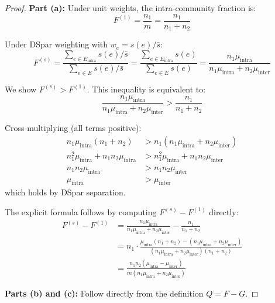 \documentclass[10pt,journal,compsoc]{IEEEtran}
\begin{document}
\begin{proof}
\textbf{Part (a):} Under unit weights, the intra-community fraction is:
\begin{equation}
F^{(1)} = \frac{n_1}{m} = \frac{n_1}{n_1 + n_2}
\end{equation}

Under DSpar weighting with $w_e = s(e)/\bar{s}$:
\begin{equation}
F^{(s)} = \frac{\sum_{e \in E_{\text{intra}}} s(e)/\bar{s}}{\sum_{e \in E} s(e)/\bar{s}} = \frac{\sum_{e \in E_{\text{intra}}} s(e)}{\sum_{e \in E} s(e)} = \frac{n_1 \mu_{\text{intra}}}{n_1 \mu_{\text{intra}} + n_2 \mu_{\text{inter}}}
\end{equation}

We show $F^{(s)} > F^{(1)}$. This inequality is equivalent to:
\begin{equation}
\frac{n_1 \mu_{\text{intra}}}{n_1 \mu_{\text{intra}} + n_2 \mu_{\text{inter}}} > \frac{n_1}{n_1 + n_2}
\end{equation}

Cross-multiplying (all terms positive):
\begin{align}
n_1 \mu_{\text{intra}} (n_1 + n_2) &> n_1 (n_1 \mu_{\text{intra}} + n_2 \mu_{\text{inter}}) \\
n_1^2 \mu_{\text{intra}} + n_1 n_2 \mu_{\text{intra}} &> n_1^2 \mu_{\text{intra}} + n_1 n_2 \mu_{\text{inter}} \\
n_1 n_2 \mu_{\text{intra}} &> n_1 n_2 \mu_{\text{inter}} \\
\mu_{\text{intra}} &> \mu_{\text{inter}}
\end{align}
which holds by DSpar separation.

The explicit formula follows by computing $F^{(s)} - F^{(1)}$ directly:
\begin{align}
F^{(s)} - F^{(1)} &= \frac{n_1 \mu_{\text{intra}}}{n_1 \mu_{\text{intra}} + n_2 \mu_{\text{inter}}} - \frac{n_1}{n_1 + n_2} \\
&= n_1 \cdot \frac{\mu_{\text{intra}}(n_1 + n_2) - (n_1 \mu_{\text{intra}} + n_2 \mu_{\text{inter}})}{(n_1 \mu_{\text{intra}} + n_2 \mu_{\text{inter}})(n_1 + n_2)} \\
&= \frac{n_1 n_2 (\mu_{\text{intra}} - \mu_{\text{inter}})}{m(n_1 \mu_{\text{intra}} + n_2 \mu_{\text{inter}})}
\end{align}

\textbf{Parts (b) and (c):} Follow directly from the definition $Q = F - G$.
\end{proof}
\end{document}
